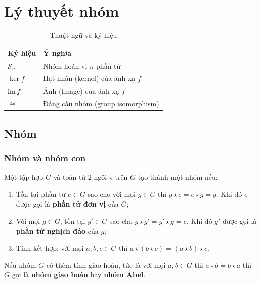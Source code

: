 \chapter{Lý thuyết nhóm}

\begin{table}[htb]
    \caption{Thuật ngữ và ký hiệu}
    \begin{tabularx}{\textwidth}
        {|>{\raggedright\arraybackslash\hsize=0.2\textwidth}X|>{\raggedright\arraybackslash}X|}
        \hline
        \textbf{Ký hiệu} & \textbf{Ý nghĩa} \\ \hline\hline
        $\mathcal{S}_n$ & Nhóm hoán vị $n$ phần tử \\ \hline
        $\ker f$ & Hạt nhân (kernel) của ánh xạ $f$ \\ \hline
        $\operatorname{im} f$ & Ảnh (Image) của ánh xạ $f$ \\ \hline
        $\cong$ & Đẳng cấu nhóm (group isomorphism) \\ \hline
    \end{tabularx}
\end{table}

\section{Nhóm}

\subsection*{Nhóm và nhóm con}

\begin{definition}
    Một tập hợp $G$ và toán tử 2 ngôi $\star$ trên $G$ tạo thành một nhóm nếu:
    \begin{enumerate}[noitemsep]
        \item Tồn tại phần tử $e \in G$ sao cho với mọi $g \in G$ thì $g \star e = e \star g = g$. Khi đó $e$ được gọi là \textbf{phần tử đơn vị} của $G$;
        \item Với mọi $g \in G$, tồn tại $g' \in G$ sao cho $g \star g' = g' \star g = e$. Khi đó $g'$ được gọi là \textbf{phần tử nghịch đảo} của $g$;
        \item Tính kết hợp: với mọi $a, b, c \in G$ thì $a \star (b \star c) = (a \star b) \star c$.
    \end{enumerate}
\end{definition}

\begin{definition}
    Nếu nhóm $G$ có thêm tính giao hoán, tức là với mọi $a, b \in G$ thì $a \star b = b \star a$ thì $G$ gọi là \textbf{nhóm giao hoán} hay \textbf{nhóm Abel}.
\end{definition}

